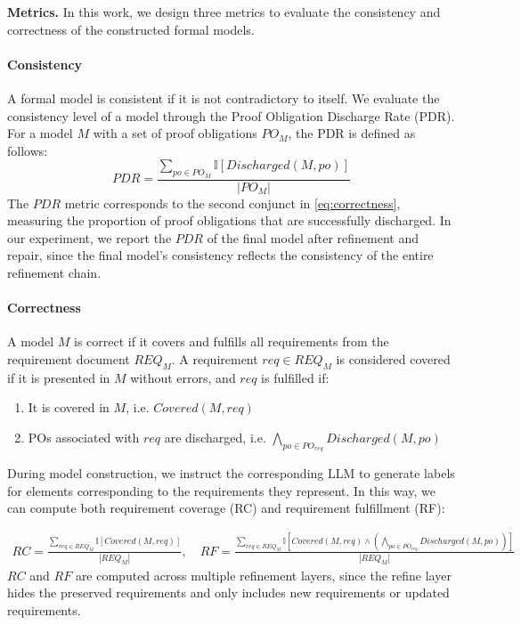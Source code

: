 \noindent \textbf{Metrics.}
In this work, we design three metrics to evaluate the consistency and correctness of the constructed formal models.

\paragraph{Consistency}
A formal model is consistent if it is not contradictory to itself.
We evaluate the consistency level of a model through the Proof Obligation Discharge Rate (PDR).
For a model $M$ with a set of proof obligations $PO_M$, the PDR is defined as follows:
{\footnotesize \[
PDR = \frac{\sum_{po \in PO_M} \mathbb{I}[Discharged(M,po)]}{|PO_M|}
\]}
The $PDR$ metric corresponds to the second conjunct in \autoref{eq:correctness}, measuring the proportion of proof obligations that are successfully discharged.
In our experiment, we report the $PDR$ of the final model after refinement and repair, since the final model's consistency reflects the consistency of the entire refinement chain.

\paragraph{Correctness}
A model $M$ is correct if it covers and fulfills all requirements from the requirement document $REQ_M$.
A requirement $req \in REQ_M$ is considered covered if it is presented in $M$ without errors, and $req$ is fulfilled if:
\begin{enumerate}
    \item It is covered in $M$, i.e. $Covered(M,req)$
    \item POs associated with $req$ are discharged, i.e. $\bigwedge_{po \in PO_{req}} Discharged(M, po)$
\end{enumerate}
During model construction, we instruct the corresponding LLM to generate labels for elements corresponding to the requirements they represent.
In this way, we can compute both requirement coverage (RC) and requirement fulfillment (RF):

{\footnotesize \[
\begin{aligned}
RC = \frac{\sum_{req \in REQ_M} \mathbb{I}[Covered(M,req)]}{|REQ_M|}, \quad
RF = \frac{\sum_{req \in REQ_M} \mathbb{I}[Covered(M,req) \land (\bigwedge_{po \in PO_{req}} Discharged(M, po))]}{|REQ_M|}
\end{aligned}
\]
}
$RC$ and $RF$ are computed across multiple refinement layers, since the refine layer hides the preserved requirements and only includes new requirements or updated requirements.

